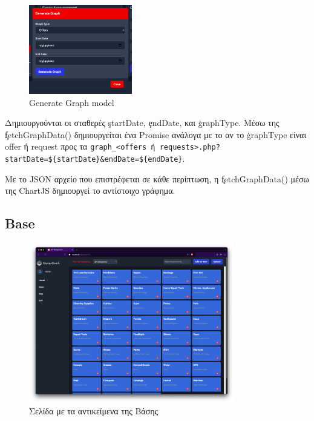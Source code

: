             \begin{figure}[H] \noindent \centering
                \includegraphics[width=0.4\textwidth]{img/admin-generate_graph}
                \caption{Generate Graph model}
            \end{figure}

            Δημιουργούνται οι σταθερές \c{startDate}, \c{endDate}, και \c{graphType}.
            Μέσω της \c{fetchGraphData()} δημιουργείται ένα Promise ανάλογα με το αν το \c{graphType} είναι offer ή request προς τα \verb|graph_<offers ή requests>.php?startDate=${startDate}&endDate=${endDate}|.

            Με το JSON αρχείο που επιστρέφεται σε κάθε περίπτωση, η \c{fetchGraphData()} μέσω της ChartJS δημιουργεί το αντίστοιχο γράφημα.

    \subsection{Base}

        \begin{figure}[H] \noindent \centering
            \includegraphics[width=0.8\textwidth]{img/admin-base}
            \caption{Σελίδα με τα αντικείμενα της Βάσης}
        \end{figure}

